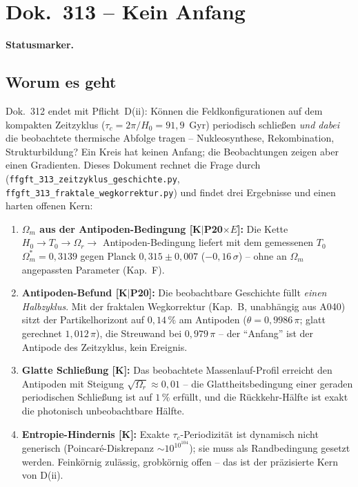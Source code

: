 \maketitle
\tableofcontents

\chapter*{Dok.~313 -- Kein Anfang}

\medskip\noindent\textbf{Statusmarker.}


\section*{Worum es geht}

Dok.~312 endet mit Pflicht~D(ii): Können die Feldkonfigurationen
auf dem kompakten Zeitzyklus ($\tau_c = 2\pi/H_0 = 91{,}9$~Gyr)
periodisch schließen \emph{und dabei} die beobachtete thermische
Abfolge tragen -- Nukleosynthese, Rekombination, Strukturbildung?
Ein Kreis hat keinen Anfang; die Beobachtungen zeigen aber einen
Gradienten. Dieses Dokument rechnet die Frage durch
(\texttt{ffgft\_313\_zeitzyklus\_geschichte.py},
\texttt{ffgft\_313\_fraktale\_wegkorrektur.py}) und findet drei
Ergebnisse und einen harten offenen Kern:

\begin{enumerate}
  \item \textbf{$\Omega_m$ aus der Antipoden-Bedingung
        [K$|$P20$\times E$]:} Die Kette
        $H_0 \to T_0 \to \Omega_r \to$ Antipoden-Bedingung liefert
        mit dem gemessenen $T_0$ $\Omega_m^{*} = 0{,}3139$ gegen
        Planck $0{,}315\pm0{,}007$ ($-0{,}16\,\sigma$) -- ohne an
        $\Omega_m$ angepassten Parameter (Kap.~F).
  \item \textbf{Antipoden-Befund [K$|$P20]:} Die beobachtbare
        Geschichte füllt \emph{einen Halbzyklus}. Mit der
        fraktalen Wegkorrektur (Kap.~B, unabhängig aus A040)
        sitzt der Partikelhorizont auf $0{,}14\,\%$ am Antipoden
        ($\theta = 0{,}9986\,\pi$; glatt gerechnet
        $1{,}012\,\pi$), die Streuwand bei $0{,}979\,\pi$ --
        der \enquote{Anfang} ist der Antipode des Zeitzyklus,
        kein Ereignis.
  \item \textbf{Glatte Schließung [K]:} Das beobachtete
        Massenlauf-Profil erreicht den Antipoden mit Steigung
        $\sqrt{\Omega_r} \approx 0{,}01$ -- die
        Glattheitsbedingung einer geraden periodischen Schließung
        ist auf $1\,\%$ erfüllt, und die Rückkehr-Hälfte ist exakt
        die photonisch unbeobachtbare Hälfte.
  \item \textbf{Entropie-Hindernis [K]:} Exakte
        $\tau_c$-Periodizität ist dynamisch nicht generisch
        (Poincaré-Diskrepanz $\sim 10^{10^{104}}$); sie muss als
        Randbedingung gesetzt werden. Feinkörnig zulässig,
        grobkörnig offen -- das ist der präzisierte Kern von
        D(ii).
\end{enumerate}

